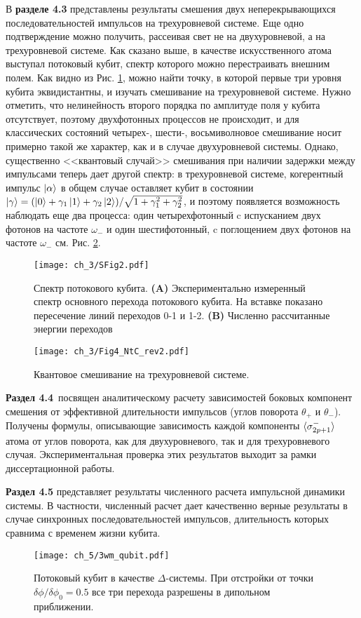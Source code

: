 В \textbf{разделе 4.3} представлены результаты смешения двух неперекрывающихся последовательностей импульсов на трехуровневой системе. Еще одно подтверждение можно получить, рассеивая свет не на двухуровневой, а на трехуровневой системе. Как сказано выше, в качестве искусственного атома выступал потоковый кубит, спектр которого можно перестраивать внешним полем. Как видно из Рис. \ref{fig: spectra_3ls}, можно найти точку, в которой первые три уровня кубита эквидистантны, и изучать смешивание на трехуровневой системе. Нужно отметить, что нелинейность второго порядка по амплитуде поля у кубита отсутствует, поэтому двухфотонных процессов не происходит, и для классических состояний четырех-, шести-, восьмиволновое смешивание носит примерно такой же характер, как и в случае двухуровневой системы. Однако, существенно <<квантовый случай>> смешивания при наличии задержки между импульсами теперь дает другой спектр: в трехуровневой системе, когерентный импульс $\ket{\alpha}$ в общем случае оставляет кубит в состоянии $\ket{\gamma} = (\ket{0}+\gamma_1\ket{1}+\gamma_2\ket{2})/\sqrt{1+\gamma_1^2+\gamma_2^2}$, и поэтому появляется возможность наблюдать еще два процесса: один четырехфотонный c испусканием двух фотонов на частоте $\omega_-$ и один шестифотонный, c поглощением двух фотонов на частоте $\omega_-$ см. Рис. \ref{fig: qwm_3ls}. 
\begin{figure}[htb]\center
	\texttt{[image: ch\_3/SFig2.pdf]}
	\caption{Спектр потокового кубита. \textbf{(A)} Экспериментально измеренный спектр основного перехода потокового кубита. На вставке показано пересечение линий переходов 0-1 и 1-2.  \textbf{(B)} Численно рассчитанные энергии переходов}
	\label{fig: spectra_3ls}	
\end{figure}

\begin{figure}[htb]\center
	\texttt{[image: ch\_3/Fig4\_NtC\_rev2.pdf]}
	\caption{Квантовое смешивание на трехуровневой системе.}
	\label{fig: qwm_3ls}	
\end{figure}
\textbf{Раздел 4.4}~посвящен аналитическому расчету зависимостей боковых компонент смешения от эффективной длительности импульсов (углов поворота $\theta_+$ и $\theta_-$). Получены формулы, описывающие зависимость каждой компоненты $\braket{\sigma^-_{2p+1}}$ атома от углов поворота, как для двухуровневого, так и для трехуровневого случая. Экспериментальная проверка этих результатов выходит за рамки диссертационной работы. 

\textbf{Раздел 4.5} представляет результаты численного расчета импульсной динамики системы. В частности, численный расчет дает качественно верные результаты в случае синхронных последовательностей импульсов, длительность которых сравнима с временем жизни кубита. 
\begin{figure}[htb]\center
	\texttt{[image: ch\_5/3wm\_qubit.pdf]}
	\caption{Потоковый кубит в качестве $\Delta$-системы. При отстройки от точки~$\delta\phi/\delta\phi_0=0.5$ все три перехода разрешены в дипольном приближении. }
	\label{fig: 3wm_qubit}	
\end{figure}

